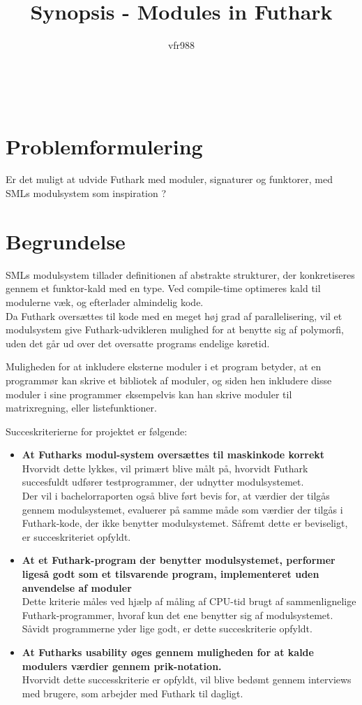 \documentclass[12pt]{article}
\title{
  Synopsis - Modules in Futhark
}
\author{vfr988}
\begin{document}
\maketitle
\clearpage
\\
\section*{Problemformulering}
Er det muligt at udvide Futhark med moduler, signaturer og funktorer, med SMLs
modulsystem som inspiration \cite{crash-course}?
\\
\section*{Begrundelse}
SMLs modulsystem tillader definitionen af abstrakte strukturer, der
konkretiseres gennem et funktor-kald med en type.
Ved compile-time optimeres kald til modulerne væk, og efterlader almindelig kode.\\
Da Futhark oversættes til kode med en meget høj grad af parallelisering, vil et
modulsystem give Futhark-udvikleren mulighed for at benytte sig af polymorfi,
uden det går ud over det oversatte programs endelige køretid.

Muligheden for at inkludere eksterne moduler i et program betyder, at en
programmør kan skrive et bibliotek af moduler, og siden hen inkludere disse
moduler i sine programmer \emph eksempelvis kan han skrive moduler til
matrixregning, eller listefunktioner.

Succeskriterierne for projektet er følgende:
\begin{itemize}
\item \textbf{At Futharks modul-system oversættes til maskinkode korrekt} \\
  Hvorvidt dette lykkes, vil primært blive målt på, hvorvidt Futhark succesfuldt udfører testprogrammer, der udnytter modulsystemet. \\ Der vil i bachelorraporten også blive ført bevis for, at værdier der tilgås gennem modulsystemet, evaluerer på samme måde som værdier der tilgås i Futhark-kode, der ikke benytter modulsystemet. Såfremt dette er beviseligt, er succeskriteriet opfyldt.
\item \textbf{At et Futhark-program der benytter modulsystemet, performer ligeså godt
  som et tilsvarende program, implementeret uden anvendelse af moduler} \\
  Dette kriterie måles ved hjælp af måling af CPU-tid brugt af sammenlignelige Futhark-programmer, hvoraf kun det ene benytter sig af modulsystemet. Såvidt programmerne yder lige godt, er dette succeskriterie opfyldt.
\item \textbf{At Futharks usability øges gennem muligheden for at kalde modulers værdier
  gennem prik-notation.}\\
  Hvorvidt dette successkriterie er opfyldt, vil blive bedømt gennem interviews med brugere, som arbejder med Futhark til dagligt.
\end{itemize}
\end{document}
